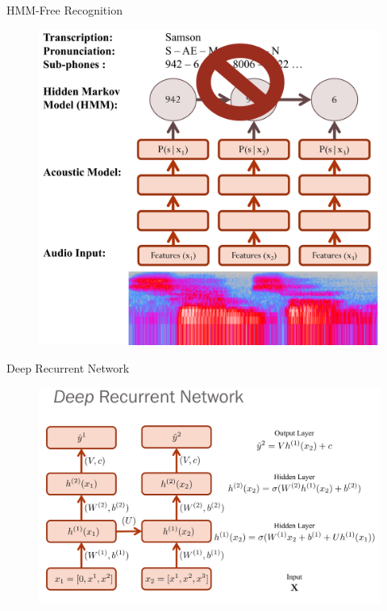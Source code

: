 \documentclass[10pt]{beamer}
\begin{document}
\begin{frame}[fragile]{HMM-Free Recognition}
\begin{figure}
	\includegraphics[height=0.8\textheight]{./images/page-11.png}
\end{figure}
\end{frame}


\begin{frame}[fragile]{Deep Recurrent Network}
\begin{figure}
\includegraphics[height=0.8\textheight]{./images/page-10.png}
\end{figure}
\end{frame}
\end{document}
